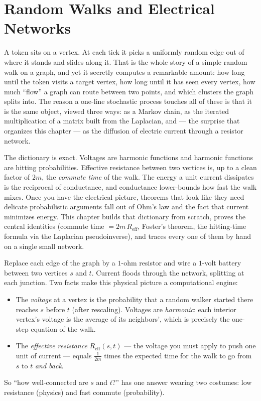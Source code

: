 \chapter{Random Walks and Electrical Networks}

A token sits on a vertex. At each tick it picks a uniformly random edge out of where it stands and slides along it. That is the whole story of a simple random walk on a graph, and yet it secretly computes a remarkable amount: how long until the token visits a target vertex, how long until it has seen every vertex, how much ``flow'' a graph can route between two points, and which clusters the graph splits into. The reason a one-line stochastic process touches all of these is that it is the same object, viewed three ways: as a Markov chain, as the iterated multiplication of a matrix built from the Laplacian, and --- the surprise that organizes this chapter --- as the diffusion of electric current through a resistor network.

The dictionary is exact. Voltages are harmonic functions and harmonic functions are hitting probabilities. Effective resistance between two vertices is, up to a clean factor of $2m$, the \emph{commute time} of the walk. The energy a unit current dissipates is the reciprocal of conductance, and conductance lower-bounds how fast the walk mixes. Once you have the electrical picture, theorems that look like they need delicate probabilistic arguments fall out of Ohm's law and the fact that current minimizes energy. This chapter builds that dictionary from scratch, proves the central identities (commute time $=2m\,R_{\mathrm{eff}}$, Foster's theorem, the hitting-time formula via the Laplacian pseudoinverse), and traces every one of them by hand on a single small network.

\begin{intuitionbox}
Replace each edge of the graph by a $1$-ohm resistor and wire a $1$-volt battery between two vertices $s$ and $t$. Current floods through the network, splitting at each junction. Two facts make this physical picture a computational engine:
\begin{itemize}
  \item The \emph{voltage} at a vertex is the probability that a random walker started there reaches $s$ before $t$ (after rescaling). Voltages are \emph{harmonic}: each interior vertex's voltage is the average of its neighbors', which is precisely the one-step equation of the walk.
  \item The \emph{effective resistance} $R_{\mathrm{eff}}(s,t)$ --- the voltage you must apply to push one unit of current --- equals $\frac{1}{2m}$ times the expected time for the walk to go from $s$ to $t$ \emph{and back}.
\end{itemize}
So ``how well-connected are $s$ and $t$?'' has one answer wearing two costumes: low resistance (physics) and fast commute (probability).
\end{intuitionbox}


